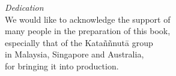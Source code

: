 
\vspace*{4\baselineskip}

{\centering

\begin{minipage}{0.9\linewidth}
\centering\small
\textit{Dedication}\\[0.4\baselineskip]
We would like to acknowledge the support of\\
many people in the preparation of this book,\\
especially that of the Kataññnutā group\\
in Malaysia, Singapore and Australia,\\
for bringing it into production.

\end{minipage}

}

